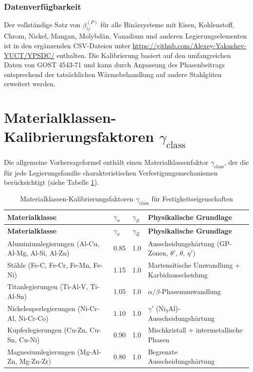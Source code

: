 \documentclass[12pt,a4paper]{article}
\begin{document}
	\subsubsection{Datenverfügbarkeit}
	Der vollständige Satz von $\beta_{ij}^{(P)}$ für alle Binärsysteme mit Eisen, Kohlenstoff, Chrom, Nickel, Mangan, Molybdän, Vanadium und anderen Legierungselementen ist in den ergänzenden CSV-Dateien unter \url{https://github.com/Alexey-Yakushev-YUCT/YPSDC/} enthalten. Die Kalibrierung basiert auf den umfangreichen Daten von GOST 4543-71 und kann durch Anpassung des Phasenbeitrags entsprechend der tatsächlichen Wärmebehandlung auf andere Stahlgüten erweitert werden.
	
	\section{Materialklassen-Kalibrierungsfaktoren $\gamma_{\text{class}}$}
	Die allgemeine Vorhersageformel enthält einen Materialklassenfaktor $\gamma_{\text{class}}$, der die für jede Legierungsfamilie charakteristischen Verfestigungsmechanismen berücksichtigt (siehe Tabelle \ref{tab:gamma_class}).
	
	\begin{longtable}{p{3.5cm} p{2.5cm} p{2.5cm} p{5cm}}
		\caption{Materialklassen-Kalibrierungsfaktoren $\gamma_{\text{class}}$ für Festigkeitseigenschaften}\label{tab:gamma_class}\\
		\toprule
		\textbf{Materialklasse} & $\gamma_{\sigma}$ & $\gamma_{E}$ & \textbf{Physikalische Grundlage} \\
		\midrule
		\endfirsthead
		\toprule
		\textbf{Materialklasse} & $\gamma_{\sigma}$ & $\gamma_{E}$ & \textbf{Physikalische Grundlage} \\
		\midrule
		\endhead
		Aluminiumlegierungen (Al-Cu, Al-Mg, Al-Si, Al-Zn) & 0.85 & 1.0 & Ausscheidungshärtung (GP-Zonen, $\theta'$, $\theta$, $\eta'$) \\
		Stähle (Fe-C, Fe-Cr, Fe-Mn, Fe-Ni) & 1.15 & 1.0 & Martensitische Umwandlung + Karbidausscheidung \\
		Titanlegierungen (Ti-Al-V, Ti-Al-Sn) & 1.05 & 1.0 & $\alpha/\beta$-Phasenumwandlung \\
		Nickelsuperlegierungen (Ni-Cr-Al, Ni-Cr-Co) & 1.10 & 1.0 & $\gamma'$ (Ni$_3$Al)-Ausscheidungshärtung \\
		Kupferlegierungen (Cu-Zn, Cu-Sn, Cu-Ni) & 0.90 & 1.0 & Mischkristall + intermetallische Phasen \\
		Magnesiumlegierungen (Mg-Al-Zn, Mg-Zn-Zr) & 0.80 & 1.0 & Begrenzte Ausscheidungshärtung \\
		\bottomrule
	\end{longtable}
	
\end{document}
